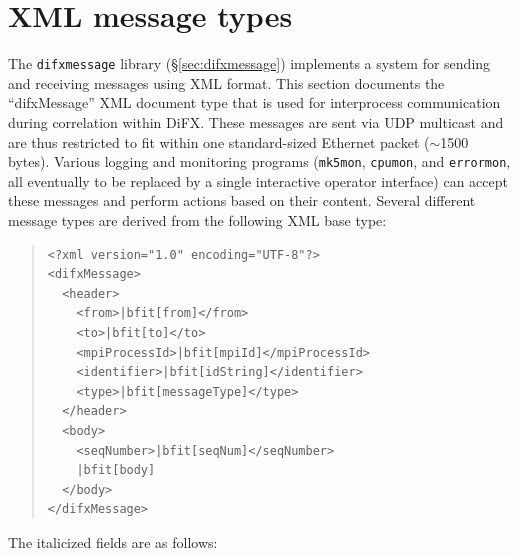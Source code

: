 \section{XML message types} \label{sec:xml}

The {\tt difxmessage} library (\S\ref{sec:difxmessage}) implements a system for sending and receiving messages using XML format.
This section documents the ``difxMessage'' XML document type that is used for interprocess communication during correlation within DiFX.
These messages are sent via UDP multicast and are thus restricted to fit within one standard-sized Ethernet packet ($\sim$1500 bytes).
Various logging and monitoring programs ({\tt mk5mon}, {\tt cpumon}, and {\tt errormon}, all eventually to be replaced by a single interactive operator interface) can accept these messages and perform actions based on their content.
Several different message types are derived from the following XML base type:

\begin{quotation}
\begin{Verbatim}[commandchars=\|\[\]]
<?xml version="1.0" encoding="UTF-8"?>
<difxMessage>
  <header>
    <from>|bfit[from]</from>
    <to>|bfit[to]</to>
    <mpiProcessId>|bfit[mpiId]</mpiProcessId>
    <identifier>|bfit[idString]</identifier>
    <type>|bfit[messageType]</type>
  </header>
  <body>
    <seqNumber>|bfit[seqNum]</seqNumber>
    |bfit[body]
  </body>
</difxMessage>
\end{Verbatim}
\end{quotation}

\noindent The italicized fields are as follows:

